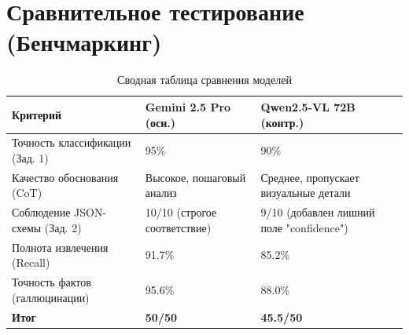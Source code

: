 \documentclass[oneside,a4paper,14pt]{extarticle} %
\begin{document}
		\newpage
		\section{Сравнительное тестирование (Бенчмаркинг)}
		\begin{table}[H]
			\centering
			\caption{Сводная таблица сравнения моделей}
			\begin{tabular}{|l|l|l|}
				\hline
				\textbf{Критерий} & \textbf{Gemini 2.5 Pro (осн.)} & \textbf{Qwen2.5-VL 72B (контр.)} \\ \hline
				Точность классификации (Зад. 1) & 95\% & 90\% \\ \hline
				Качество обоснования (CoT) & Высокое, пошаговый анализ & Среднее, пропускает визуальные детали \\ \hline
				Соблюдение JSON-схемы (Зад. 2) & 10/10 (строгое соответствие) & 9/10 (добавлен лишний поле "confidence") \\ \hline
				Полнота извлечения (Recall) & 91.7\% & 85.2\% \\ \hline
				Точность фактов (галлюцинации) & 95.6\% & 88.0\% \\ \hline
				\textbf{Итог} & \textbf{50/50} & \textbf{45.5/50} \\ \hline
			\end{tabular}
		\end{table}
		
		\newpage
\end{document}
